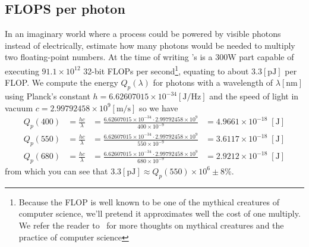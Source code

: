 \subsection{FLOPS per photon}\label{sec:energy_photon}

In an imaginary world where a process could be powered by visible photons instead of electrically,
estimate how many photons would be needed to multiply two floating-point numbers.
At the time of writing 's   is a 
$300 \unit{\watt}$ part capable of executing $91.1 \times 10^{12}$ 32-bit \glspl{FLOP} per 
second\footnote{
	Because the \gls{FLOP} is well known to be one of the mythical creatures of computer 
	science, we'll pretend it approximates well the cost of one multiply.
	We refer the reader to~\cite{brooks95} for more thoughts on mythical creatures and the 
	practice of computer science},
equating to about $3.3 [\unit{\pico\joule}]$ per \gls{FLOP}.
We compute the energy $Q_p(\lambda)$ for photons with a wavelength of $\lambda [\unit{\nano\meter}]$ 
using Planck's constant $h = 6.62607015 \times 10^{-34} [\unit{\joule\per\hertz}]$ 
and the speed of light in vacuum $c = 2.99792458 \times 10^{9}[\unit{\meter\per\second}]$ so we have
\begin{align}
	Q_p(400) &= \frac{hc}{\lambda} 
		&= \frac{6.62607015 \times 10^{-34} \cdot 2.99792458 \times 10^{9}}{400\times 10^{-9}}
	 	&= 4.9661 \times 10^{-18}\;[\unit{\joule}] \\
	Q_p(550) &= \frac{hc}{\lambda} 
		&= \frac{6.62607015 \times 10^{-34} \cdot 2.99792458 \times 10^{9}}{550\times 10^{-9}}
	 	&= 3.6117 \times 10^{-18}\;[\unit{\joule}] \\
	Q_p(680) &= \frac{hc}{\lambda} 
		&= \frac{6.62607015 \times 10^{-34} \cdot 2.99792458 \times 10^{9}}{680\times 10^{-9}}
	 	&= 2.9212 \times 10^{-18}\;[\unit{\joule}]
\end{align}
from which you can see that $3.3 [\unit{\pico\joule}] \approx Q_p(550) \times 10^{6} \pm 8\%$.



